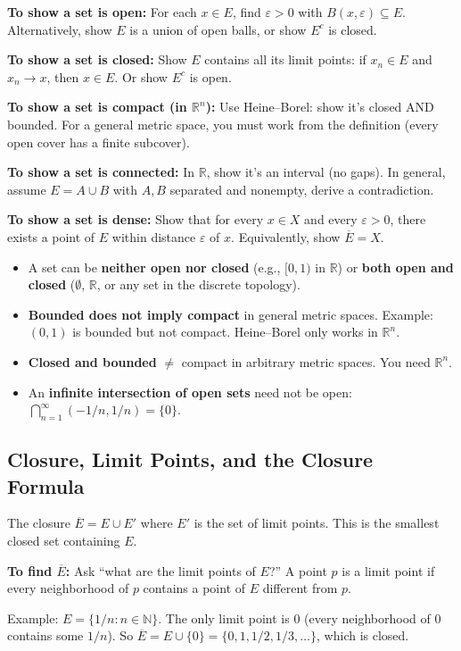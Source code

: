 \documentclass[11pt]{article}
\newcommand{\R}{\mathbb{R}}
\newcommand{\N}{\mathbb{N}}
\newcommand{\eps}{\varepsilon}
\theoremstyle{definition}
\begin{document}
\begin{application}
\textbf{To show a set is open:} For each $x \in E$, find $\eps > 0$ with $B(x, \eps) \subseteq E$. Alternatively, show $E$ is a union of open balls, or show $E^c$ is closed.

\textbf{To show a set is closed:} Show $E$ contains all its limit points: if $x_n \in E$ and $x_n \to x$, then $x \in E$. Or show $E^c$ is open.

\textbf{To show a set is compact (in $\R^n$):} Use Heine--Borel: show it's closed AND bounded. For a general metric space, you must work from the definition (every open cover has a finite subcover).

\textbf{To show a set is connected:} In $\R$, show it's an interval (no gaps). In general, assume $E = A \cup B$ with $A, B$ separated and nonempty, derive a contradiction.

\textbf{To show a set is dense:} Show that for every $x \in X$ and every $\eps > 0$, there exists a point of $E$ within distance $\eps$ of $x$. Equivalently, show $\overline{E} = X$.
\end{application}

\begin{pitfall}
\begin{itemize}
\item A set can be \textbf{neither open nor closed} (e.g., $[0, 1)$ in $\R$) or \textbf{both open and closed} ($\emptyset$, $\R$, or any set in the discrete topology).
\item \textbf{Bounded does not imply compact} in general metric spaces. Example: $(0, 1)$ is bounded but not compact. Heine--Borel only works in $\R^n$.
\item \textbf{Closed and bounded} $\neq$ compact in arbitrary metric spaces. You need $\R^n$.
\item An \textbf{infinite intersection of open sets} need not be open: $\bigcap_{n=1}^\infty (-1/n, 1/n) = \{0\}$.
\end{itemize}
\end{pitfall}

\subsection{Closure, Limit Points, and the Closure Formula}

The closure $\overline{E} = E \cup E'$ where $E'$ is the set of limit points. This is the smallest closed set containing $E$.

\begin{application}
\textbf{To find $\overline{E}$:} Ask ``what are the limit points of $E$?'' A point $p$ is a limit point if every neighborhood of $p$ contains a point of $E$ different from $p$.

Example: $E = \{1/n : n \in \N\}$. The only limit point is $0$ (every neighborhood of $0$ contains some $1/n$). So $\overline{E} = E \cup \{0\} = \{0, 1, 1/2, 1/3, \ldots\}$, which is closed.
\end{application}
\end{document}
